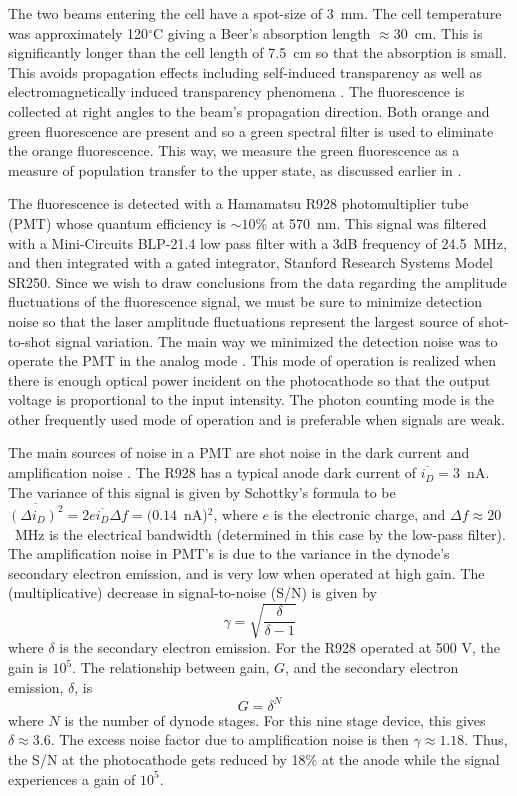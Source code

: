 The two beams entering the cell have a spot-size of 3~mm.  The cell temperature
was approximately 120$^{\circ}$C giving a Beer's absorption length
$\approx 30$~cm.  This is significantly longer than the cell length of 7.5~cm
so that the absorption is small.  This avoids propagation effects including
self-induced transparency \cite{Allen:87} as well as electromagnetically induced
transparency phenomena \cite{Harris:94,Eberly:94}. The fluorescence is collected
at right angles to the beam's propagation direction.  Both orange and green
fluorescence are present and so a green spectral filter is used to eliminate the
orange fluorescence.  This way, we measure the green fluorescence as a measure
of population transfer to the upper state, as discussed earlier in
.

The fluorescence is detected with a Hamamatsu R928 photomultiplier tube (PMT)
whose quantum efficiency is $\sim 10$\% at 570~nm.  This signal was filtered
with a Mini-Circuits BLP-21.4 low pass filter with a 3dB frequency of 24.5~MHz,
and then integrated with a gated integrator, Stanford Research Systems Model
SR250.  Since we wish to draw conclusions from the data regarding the amplitude
fluctuations of the fluorescence signal, we must be sure to minimize detection
noise so that the laser amplitude fluctuations represent the largest source of
shot-to-shot signal variation.  The main way we minimized the detection noise
was to operate the PMT in the analog mode \cite{Hamamatsu_book}.  This mode of
operation is realized when there is enough optical power incident on the
photocathode so that the output voltage is proportional to the input intensity. 
The photon counting mode is the other frequently used mode of operation and is
preferable when signals are weak.  

The main sources of noise in a PMT are shot noise in the dark
current and amplification noise \cite{Boyd_book1}.  The R928 has a typical
anode dark current of $ \overline{i_D} = 3$~nA.  The variance of this signal
is given by Schottky's formula to be $\overline{(\Delta i_D)^2} = 2 e
\overline{i_D} \Delta f = (0.14$~nA)$^2$, where $e$ is the electronic charge,
and $\Delta f \approx 20$~MHz is the electrical bandwidth (determined in this
case by the low-pass filter).  The amplification noise in PMT's is due to the
variance in the dynode's secondary electron emission, and is very low when
operated at high gain. The (multiplicative) decrease in signal-to-noise (S/N)
is given by \cite{Boyd_book1}
\begin{equation}
\gamma = \sqrt{\frac{\delta}{\delta -1}}
\end{equation}
where $\delta$ is the secondary electron emission.  For the R928 operated at
500 V, the gain is $10^{5}$. The relationship between gain, $G$, and the
secondary electron emission, $\delta$, is
\begin{equation}
G = \delta^N
\end{equation}
where $N$ is the number of dynode stages.  For this nine stage device,
this gives $\delta \approx 3.6$.  The excess noise factor due to amplification
noise is then $\gamma \approx 1.18$.  Thus, the S/N at the photocathode gets
reduced by 18\% at the anode while the signal experiences a gain of $10^5$.

